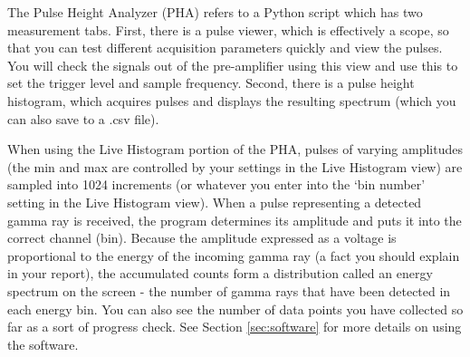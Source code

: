 \documentclass{../lab}
\begin{document}
The Pulse Height Analyzer (PHA) refers to a Python script which has two measurement tabs. First, there is a pulse viewer, which is effectively a scope, so that you can test different acquisition parameters quickly and view the pulses. You will check the signals out of the pre-amplifier using this view and use this to set the trigger level and sample frequency. Second, there is a pulse height histogram, which acquires pulses and displays the resulting spectrum (which you can also save to a .csv file). %

When using the Live Histogram portion of the PHA, pulses of varying amplitudes (the min and max are controlled by your settings in the Live Histogram view) are sampled into 1024 increments (or whatever you enter into the `bin number' setting in the Live Histogram view). When a pulse representing a detected gamma ray is received, the program determines its amplitude and puts it into the correct channel (bin). Because the amplitude expressed as a voltage is proportional to the energy of the incoming gamma ray (a fact you should explain in your report), the accumulated counts form a distribution called an energy spectrum on the screen - the number of gamma rays that have been detected in each energy bin. You can also see the number of data points you have collected so far as a sort of progress check. See Section \ref{sec:software} for more details on using the software.
\end{document}
